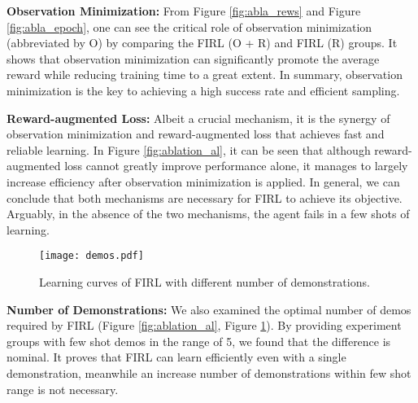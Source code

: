 \documentclass[conference]{IEEEtran}
\begin{document}
\textbf{Observation Minimization:}
From Figure \ref{fig:abla_rews} and Figure \ref{fig:abla_epoch}, one can see the critical role of observation minimization (abbreviated by O) by comparing the FIRL (O + R) and FIRL (R) groups. It shows that observation minimization can significantly promote the average reward while reducing training time to a great extent. In summary, observation minimization is the key to achieving a high success rate and efficient sampling.
\begin{table}[H]
    \caption{Ablation Study groups. R: Reward-augmented loss. O: Observation minimization.}
    
    \label{table:ablation_groups}
    
    \begin{center}
    
    \end{center}
\end{table}
\textbf{Reward-augmented Loss:}
Albeit a crucial mechanism, it is the synergy of observation minimization and reward-augmented loss that achieves fast and reliable learning. In Figure \ref{fig:ablation_al}, it can be seen that although reward-augmented loss cannot greatly improve performance alone, it manages to largely increase efficiency after observation minimization is applied. 
In general, we can conclude that both mechanisms are necessary for FIRL to achieve its objective. Arguably, in the absence of the two mechanisms, the agent fails in a few shots of learning. 

\begin{figure}[b]
    \centering
     \texttt{[image: demos.pdf]}
    \caption{Learning curves of FIRL with different number of demonstrations.}
    \label{fig:demos}
\end{figure}

\textbf{Number of Demonstrations:}
We also examined the optimal number of demos required by FIRL (Figure \ref{fig:ablation_al}, Figure \ref{fig:demos}). By providing experiment groups with few shot demos in the range of 5, we found that the difference is nominal. It proves that FIRL can learn efficiently even with a single demonstration, meanwhile an increase number of demonstrations within few shot range is not necessary.
\end{document}
